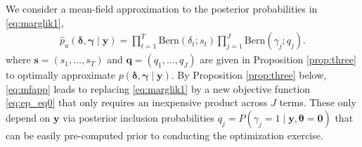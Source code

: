 \documentclass[12pt]{article}
\newcommand{\mb}[1]{\mathbf{#1}}
\newcommand{\by}{{\mb{y}}}
\newcommand{\bgamma}{{\bm{\gamma}}}
\newcommand{\bdelta}{{\bm{\delta}}}
\newcommand{\btheta}{{\bm{\theta}}}
\begin{document}
We consider a mean-field approximation to the posterior probabilities in \eqref{eq:marglik1},
\begin{align}
\hat{p}_{u}(\bdelta, \bgamma \mid \by) = \prod_{t=1}^{T} \text{Bern}(\delta_{t}; s_{t}) \prod_{j=1}^{J} \text{Bern}(\gamma_{j}; q_{j}). \label{eq:mfapp}
\end{align}
where $\mb{s}=(s_1,\ldots,s_T)$ and $\mb{q}=(q_1,\ldots,q_J)$ are given in Proposition \ref{prop:three} to optimally approximate $p(\bdelta, \bgamma \mid \by)$. 
By Proposition \ref{prop:three} below, \eqref{eq:mfapp} leads to replacing \eqref{eq:marglik1} by a new objective function
\eqref{eq:ep_eq0} that only requires an inexpensive product across $J$ terms. These only depend on $\by$ via posterior inclusion probabilities $q_{j} = P(\gamma_{j} = 1 \mid \by, \btheta = \mb{0})$ that can be easily pre-computed prior to conducting the optimization exercise.
\end{document}
